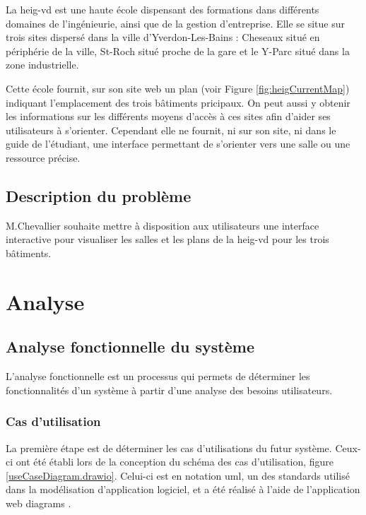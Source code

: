 \documentclass[
    iai, %
    il, %
]{heig-tb}
\begin{document}
La \gls{heig-vd} est une haute école dispensant des formations dans différents domaines de l'ingénieurie, ainsi que de la gestion d'entreprise.
Elle se situe sur trois sites dispersé dans la ville d'Yverdon-Les-Bains
: Cheseaux  situé en périphérie de la ville, St-Roch situé proche de la gare et le Y-Parc situé dans la zone industrielle.

Cette école fournit, sur son site web un plan \cite{plan-heig} (voir Figure \ref{fig:heigCurrentMap}) indiquant l'emplacement des trois bâtiments pricipaux.
On peut aussi y obtenir les informations sur les différents moyens d'accès à ces sites afin d'aider ses utilisateurs à s'orienter.
Cependant elle ne fournit, ni sur son site, ni dans le guide de l'étudiant, une interface permettant de s'orienter vers une salle ou une ressource précise.

\section{Description du problème}
M.Chevallier souhaite mettre à disposition aux utilisateurs une interface interactive pour visualiser les salles et les plans de la \gls{heig-vd} pour les trois bâtiments.

\chapter{Analyse}
\section{Analyse fonctionnelle du système}
L'analyse fonctionnelle est un processus qui permets de déterminer les fonctionnalités d'un système à partir d'une analyse des besoins utilisateurs.

\subsection{Cas d'utilisation}
La première étape est de déterminer les cas d'utilisations du futur système.
Ceux-ci ont été établi lors de la conception du schéma des cas d'utilisation, figure \ref{useCaseDiagram.drawio}.
Celui-ci est en notation \gls{uml}, un des standards utilisé dans la modélisation d'application logiciel,
et a été réalisé à l'aide de l'application web \gls{diagrams} \cite{diagrams}.

\end{document}
